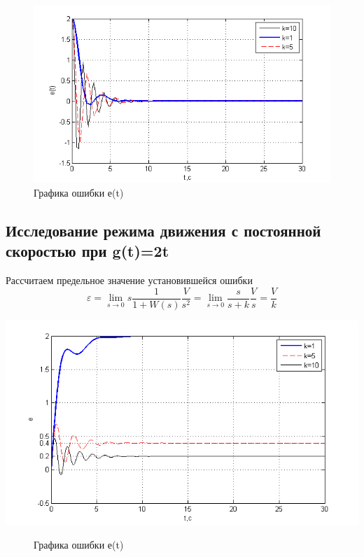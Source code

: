 \documentclass[a4paper, 12pt]{article}
\begin{document}
	\begin{figure}[h]
		\centering
		\includegraphics[width=0.95\linewidth]{7}
		\caption{Графика ошибки е(t)}
		\label{fig:7}
	\end{figure}

\subsection{Исследование режима движения с постоянной скоростью при g(t)=2t}\hfill\par
Рассчитаем предельное значение установившейся ошибки
\begin{equation}
\varepsilon  = \mathop {\lim }\limits_{s \to 0} s\frac{1}{{1 + W(s)}}\frac{V}{{{s^2}}} = \mathop {\lim }\limits_{s \to 0} \frac{s}{{s + k}}\frac{V}{s} = \frac{V}{k}
\end{equation}



\begin{center}
	\includegraphics[width=0.95\linewidth]{6}
	\begin{figure}[h]
		\centering
		
		\caption{Графика ошибки е(t)}
		\label{fig:6}
	\end{figure}
\end{center}
\end{document}

